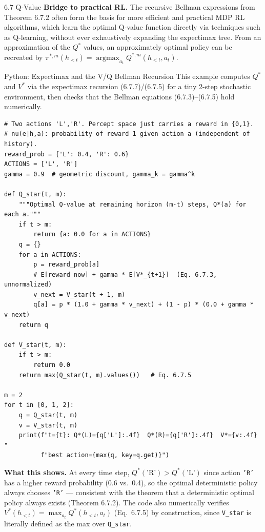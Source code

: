 \documentclass[aspectratio=169,10pt]{beamer}
\begin{document}
\begin{frame}[allowframebreaks]{6.7 Q-Value}
\vspace{0.2cm}
\textbf{Bridge to practical RL.} The recursive Bellman expressions from
Theorem 6.7.2 often form the basis for more efficient and practical MDP RL
algorithms, which learn the optimal Q-value function directly via
techniques such as Q-learning, without ever exhaustively expanding the
expectimax tree. From an approximation of the $Q^{*}$ values, an
approximately optimal policy can be recreated by
$\pi^{*,m}(h_{<t}) = \operatorname{argmax}_{a_t}Q^{*,m}(h_{<t},a_t)$.
\end{frame}

\begin{frame}[fragile]{Python: Expectimax and the V/Q Bellman Recursion}
This example computes $Q^{*}$ and $V^{*}$ via the expectimax recursion
(6.7.7)/(6.7.5) for a tiny 2-step stochastic environment, then checks that
the Bellman equations (6.7.3)--(6.7.5) hold numerically.

\begin{lstlisting}
# Two actions 'L','R'. Percept space just carries a reward in {0,1}.
# nu(e|h,a): probability of reward 1 given action a (independent of history).
reward_prob = {'L': 0.4, 'R': 0.6}
ACTIONS = ['L', 'R']
gamma = 0.9  # geometric discount, gamma_k = gamma^k

def Q_star(t, m):
    """Optimal Q-value at remaining horizon (m-t) steps, Q*(a) for each a."""
    if t > m:
        return {a: 0.0 for a in ACTIONS}
    q = {}
    for a in ACTIONS:
        p = reward_prob[a]
        # E[reward now] + gamma * E[V*_{t+1}]  (Eq. 6.7.3, unnormalized)
        v_next = V_star(t + 1, m)
        q[a] = p * (1.0 + gamma * v_next) + (1 - p) * (0.0 + gamma * v_next)
    return q

def V_star(t, m):
    if t > m:
        return 0.0
    return max(Q_star(t, m).values())   # Eq. 6.7.5

m = 2
for t in [0, 1, 2]:
    q = Q_star(t, m)
    v = V_star(t, m)
    print(f"t={t}: Q*(L)={q['L']:.4f}  Q*(R)={q['R']:.4f}  V*={v:.4f}  "
          f"best action={max(q, key=q.get)}")
\end{lstlisting}

\textbf{What this shows.} At every time step, $Q^{*}(\text{'R'}) >
Q^{*}(\text{'L'})$ since action \texttt{'R'} has a higher reward
probability (0.6 vs.\ 0.4), so the optimal deterministic policy always
chooses \texttt{'R'} --- consistent with the theorem that a deterministic
optimal policy always exists (Theorem 6.7.2). The code also numerically
verifies $V^{*}(h_{<t}) = \max_{a_t}Q^{*}(h_{<t},a_t)$ (Eq.\ 6.7.5) by
construction, since \texttt{V\_star} is literally defined as the max over
\texttt{Q\_star}.
\end{frame}
\end{document}
